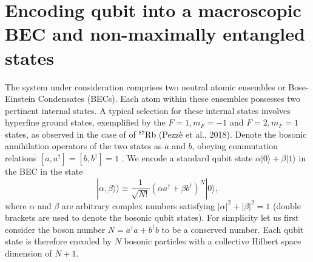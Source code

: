 \documentclass[
aps,%
12pt,%
final,%
notitlepage,%
oneside,%
onecolumn,%
nobibnotes,%
nofootinbib,%
superscriptaddress,%
noshowpacs,%
centertags]%
{revtex4}
\begin{document}
\section{Encoding qubit into a macroscopic BEC and non-maximally entangled states}

The system under consideration comprises two neutral atomic ensembles or Bose-Einstein Condensates (BECs). Each atom within these ensembles possesses two pertinent internal states. A typical selection for these internal states involves hyperfine ground states, exemplified by the $ F= 1, m_F = - 1 $ and $ F = 2, m_F = 1 $ states, as observed in the case of of $^{87}$Rb (Pezzè et al., 2018). Denote the bosonic annihilation operators of the two states as $ a $ and $ b $, obeying commutation relations $ [a,a^\dagger]= [b,b^\dagger]= 1 $ \cite{li2009spin}. We encode a standard qubit state $ \alpha | 0 \rangle + \beta |1 \rangle $ in the BEC in the state
%
\begin{equation}
\label{singlequbitstate}
|\alpha, \beta \rangle \rangle \equiv \frac{1}{\sqrt{N!}} \left( \alpha a^\dagger + \beta b^\dagger \right)^N |0 \rangle ,
\end{equation}
%
where $ \alpha $ and $ \beta $ are arbitrary complex numbers satisfying $ |\alpha |^2 + | \beta |^2 = 1 $ 
(double brackets are used to denote the bosonic qubit states).  For simplicity let us first consider the boson number $ N = a^\dagger a + b^\dagger b $ to be a conserved number. Each qubit state is therefore encoded by $ N $ bosonic particles with a collective Hilbert space dimension of $ N+1 $. 
\end{document}
